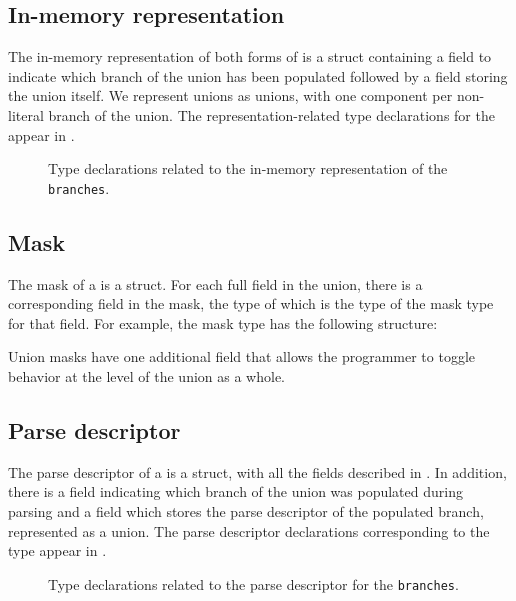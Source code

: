 \subsection{In-memory representation}
\label{sec:unions-rep}
The in-memory representation of both forms of \Punion{} is 
a \C{} struct containing a  field to indicate which branch of the
union has been populated followed by a  field storing the union
itself.  We represent unions as \C{} unions, with one component per
non-literal branch of the union.  
The representation-related type declarations for
the \Punion{}  appear in .

\begin{figure}

\caption{Type declarations related to the in-memory representation of
  the \Punion{} \texttt{branches}.}
\label{fig:punion-rep}
\end{figure}

\subsection{Mask}
\label{sec:unions-masks}
The mask of a \Punion{} is a \C{} struct.  
For each full field in the union,
there is a corresponding field in the mask, the type of which is the
type of the mask type for that field.   For example, the mask type
 has the following structure:

Union masks have one additional field  that allows the
programmer to toggle behavior at the level of the union as a whole.

\subsection{Parse descriptor}
\label{sec:unions-parse-descriptors}
The parse descriptor of a \Punion{} is a \C{} struct, with all
the fields described in . In
addition,  there is a  field indicating which branch of the
union was populated during parsing and a  field which stores
the parse descriptor of the populated branch, represented as a \C{}
union.  The parse descriptor declarations corresponding to the
\pads{} type 
appear in .

\begin{figure}

\caption{Type declarations related to the parse descriptor for
  the \Punion{} \texttt{branches}.}
\label{fig:punion-pd}
\end{figure}

